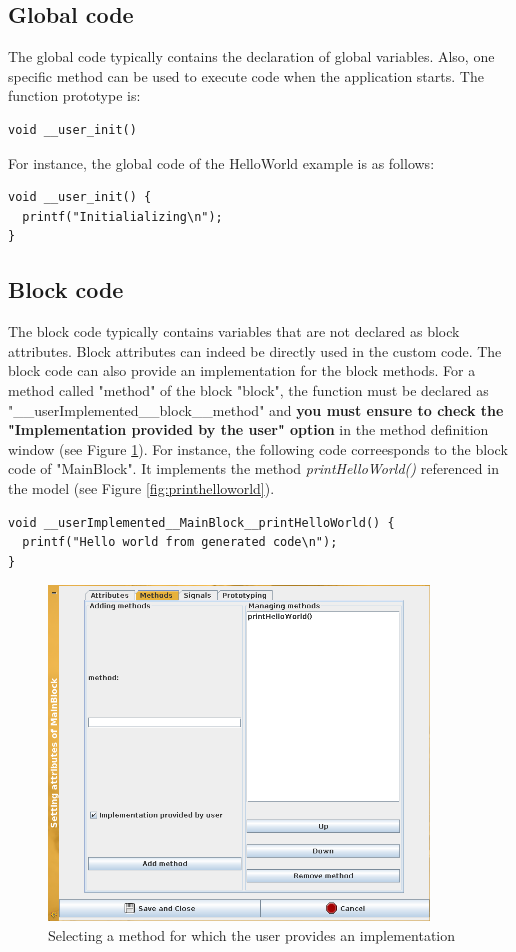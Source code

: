 \documentclass[12pt]{article}
\begin{document}
\subsection{Global code}
The global code typically contains the declaration of global variables. Also, one specific method can be used to execute code when the application starts. The function prototype is: 
\begin{verbatim}
void __user_init()
\end{verbatim}
For instance, the global code of the HelloWorld example is as follows:
\begin{lstlisting}
void __user_init() {
  printf("Initialializing\n");
}
\end{lstlisting}

\subsection{Block code}
The block code typically contains variables that are not declared as block attributes. Block attributes can indeed be directly used in the custom code. The block code can also provide an implementation for the block methods. For a method called "method" of the block "block", the function must be declared as "\_\_userImplemented\_\_block\_\_method" and \textbf{you must ensure to check the "Implementation provided by the user" option} in the method definition window (see Figure \ref{fig:methodhelloworld}). For instance, the following code correesponds to the block code of "MainBlock". It implements the method \textit{printHelloWorld()} referenced in the model (see Figure \ref{fig:printhelloworld}).
\begin{lstlisting}
void __userImplemented__MainBlock__printHelloWorld() {
  printf("Hello world from generated code\n");
}
\end{lstlisting}

\begin{figure}[htbp]
\centering
\includegraphics[width=0.9\textwidth]{figures/methodhelloworld}
\caption{Selecting a method for which the user provides an implementation}\label{fig:methodhelloworld}
\end{figure}
\end{document}
